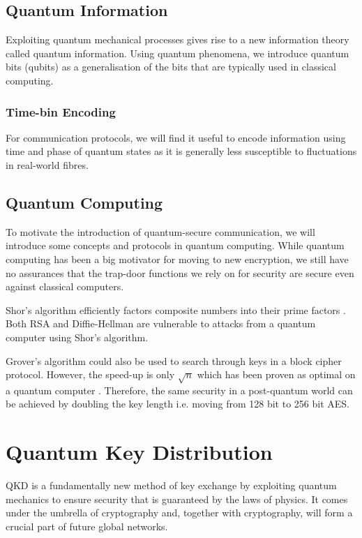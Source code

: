 \subsection{Quantum Information}

Exploiting quantum mechanical processes gives rise to a new information theory called {\textcolor{bristol-red} quantum information}. Using quantum phenomena, we introduce quantum bits (qubits) as a generalisation of the bits that are typically used in classical computing.

\subsubsection{Time-bin Encoding}

For communication protocols, we will find it useful to encode information using time and phase of quantum states as it is generally less susceptible to fluctuations in real-world fibres.

\subsection{Quantum Computing}

To motivate the introduction of quantum-secure communication, we will introduce some concepts and protocols in quantum computing. While quantum computing has been a big motivator for moving to new encryption, we still have no assurances that the trap-door functions we rely on for security are secure even against classical computers.

Shor's algorithm efficiently factors composite numbers into their prime factors \cite{shor1994}. Both RSA and Diffie-Hellman are vulnerable to attacks from a quantum computer using Shor's algorithm.

Grover's algorithm could also be used to search through keys in a block cipher protocol. However, the speed-up is only $\sqrt{n}$ which has been proven as optimal on a quantum computer \cite{Bennent1997} . Therefore, the same security in a post-quantum world can be achieved by doubling the key length i.e. moving from 128 bit to 256 bit AES.

\section{Quantum Key Distribution}

\Acl{QKD} is a fundamentally new method of key exchange by exploiting quantum mechanics to ensure security that is guaranteed by the laws of physics. It comes under the umbrella of  cryptography and, together with  cryptography, will form a crucial part of future global networks.

